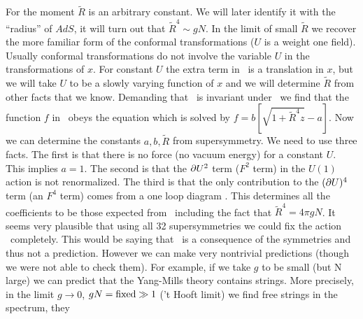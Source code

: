 For the moment $\tilde R$
 is an arbitrary constant.
We will later identify it with the ``radius'' of $AdS$, it will 
turn out that $\tilde R^4 \sim g N$. 
In the limit of small $\tilde R$  we recover the more familiar  form 
of the conformal transformations ($U$ is a weight one field).
Usually  conformal transformations do not
involve the variable $U$ in the transformations of $x$.
For constant $U$ the
extra
term in \espconf\ is 
 a translation in $x$, but we will take $U$ to
be a slowly varying function of $x$ and we will determine $\tilde R$
from other facts  that we know. 
Demanding that \probegen\ is invariant under  \espconf\ 
we find that the function $f$ in \probegen\ obeys the equation
\eqn{}
which is solved by $ f =  b [\sqrt{1+ \tilde R^4 z} -a]$.
Now we can determine the  constants $a,b,\tilde R$ from
supersymmetry.
We need to use three facts. The first is that there is no force
(no vacuum energy) for a constant $U$. This implies $a=1$.
The second is that the $\partial U^2 $ term ($F^2$ term) 
in the $U(1)$ action is not
renormalized. The third is that the only contribution to the 
$(\partial U)^4$ term (an $F^4$ term) comes from a one loop diagram \dinesei .
This determines all the coefficients to be those expected from 
\probeaction\
including the fact that $\tilde R^4 = 4 \pi g N $.
%
It seems very plausible that using all 32 supersymmetries we could
fix the action \probeaction\ completely.
This would be saying that \probeaction\
 is a  consequence of the symmetries
and thus not a prediction.  
However we can make very nontrivial predictions (though we were not
able to check them). For example,
if  we take $g$ to be small (but N large)  we can predict that
the Yang-Mills theory contains strings.
 More precisely, in the limit $g \to 0$, $g N ={\rm fixed}
\gg 1$ ('t Hooft limit) we find free strings in the spectrum, they 
